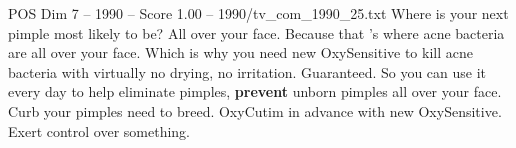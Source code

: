 \begin{textsample}{POS Dim 7 – 1990 – Score 1.00 – 1990/tv\_com\_1990\_25.txt}  \label{ex:f7_pos_068}
Where is your next pimple most likely to be?
All over your face.
Because that 's where acne bacteria are all over your face.
Which is why you need new OxySensitive to kill acne bacteria with virtually no drying, no irritation.
Guaranteed.
So you can use it every day to help eliminate pimples, \textbf{prevent} unborn pimples all over your face.
Curb your pimples need to breed.
OxyCutim in advance with new OxySensitive.
Exert control over something.

\end{textsample}
